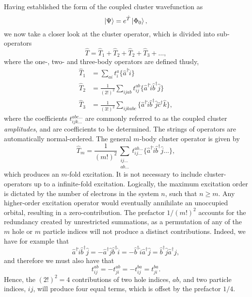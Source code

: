 Having established the form of the coupled cluster wavefunction as 
\begin{equation}
    \ket{\Psi} = e^{\hat{T}} \ket{\Phi_0},
\end{equation}
we now take a closer look at the cluster operator, which is divided into sub-operators 
\begin{equation}
    \hat{T} = \hat{T}_1 +  \hat{T}_2 + \hat{T}_2 + \hat{T}_3 + \dots,
\end{equation}
where the one-, two- and three-body operators are defined thusly,
\begin{align}
    \hat{T}_1 &= \sum_{ai}t^a_i\{\hat{a}^\dagger \hat{i} \} \\
    \hat{T}_2 &= \frac{1}{(2!)^2}\sum_{ijab} t^{ab}_{ij} 
        \{\hat{a}^\dagger \hat{i} \hat{b}^\dagger \hat{j} \} \\
    \hat{T}_3 &= \frac{1}{(3!)^2} \sum_{ijkabc} 
        \{\hat{a}^\dagger \hat{i} \hat{b}^\dagger \hat{j} \hat{c}^\dagger \hat{k} \},
\end{align}
where the coefficients $t^{abc\dots}_{ijk\dots}$ are commonly referred to as the 
coupled cluster \emph{amplitudes}, and are coefficients to be determined. The strings 
of operators are automatically normal-ordered. The general $m$-body cluster operator 
is given by 
\begin{equation}
    \hat{T}_m = \frac{1}{(m!)^2} \sum_{\substack{ij\dots \\ ab \dots}}
        t^{ab\dots}_{ij\dots} \{\hat{a}^\dagger \hat{i} \hat{b}^\dagger \hat{j} \dots\},
\end{equation}
which produces an $m$-fold excitation. It is not necessary to include cluster-operators
up to a infinite-fold excitation. Logically, the maximum excitation order is dictated by the number 
of electrons in the system $n$, such that $n \geq m$. Any higher-order excitation operator
would eventually annihilate an unoccupied orbital, resulting in a zero-contribution.
The prefactor $1/(m!)^2$ accounts for the redundancy created by unrestricted summations,
as a permutation of any of the $m$ hole or $m$ particle indices will not produce a 
distinct contributions. Indeed, we have for example that
\begin{equation}
    \hat{a}^\dagger \hat{i} \hat{b}^\dagger \hat{j} 
    = - \hat{a}^\dagger \hat{j} \hat{b}^\dagger \hat{i}
    = - \hat{b}^\dagger \hat{i} \hat{a}^\dagger \hat{j} 
    = \hat{b}^\dagger \hat{j} \hat{a}^\dagger \hat{j},
\end{equation}
and therefore we must also have that 
\begin{equation}
    t^{ab}_{ij} = - t^{ab}_{ji} = -t^{ba}_{ij} = t^{ba}_{ji}.
\end{equation}
Hence, the $(2!)^2 = 4$ contributions of two hole indices, $ab$, and two particle indices,
$ij$, will produce four equal terms, which is offset by the prefactor $1/4$.

